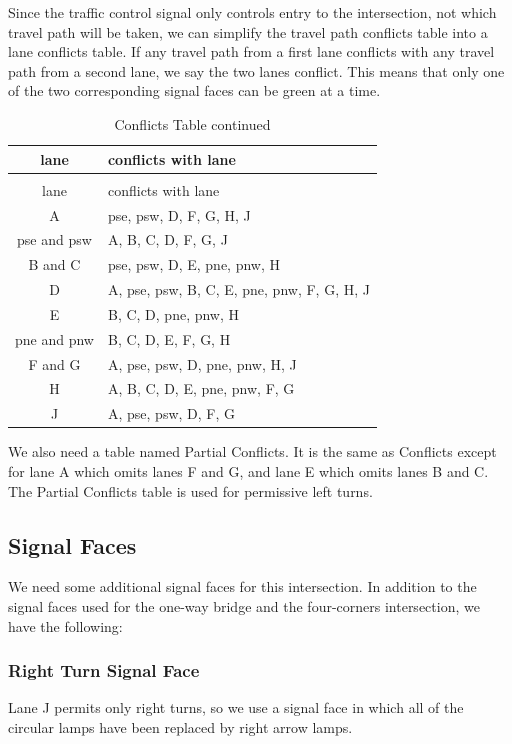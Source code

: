 \documentclass[letterpaper,twoside]{article}
\begin{document}
Since the traffic control signal only controls entry to the
intersection, not which travel path will be taken,
we can simplify the travel path conflicts table into a lane
conflicts table.  If any travel path from a first lane conflicts with
any travel path from a second lane, we say the two lanes conflict.
This means that only one of the two corresponding signal faces
can be green at a time.

\begin{longtable}{c | l}
  \caption{Conflicts Table} \\
  lane & conflicts with lane \\
  \hline \endfirsthead
  \caption{Conflicts Table continued} \\
  lane & conflicts with lane \\
  \hline \endhead
  A & pse, psw, D, F, G, H, J \\
  pse and psw & A, B, C, D, F, G, J \\
  B and C & pse, psw, D, E, pne, pnw, H \\
  D & A, pse, psw, B, C, E, pne, pnw, F, G, H, J \\
  E & B, C, D, pne, pnw, H \\
  pne and pnw & B, C, D, E, F, G, H \\
  F and G & A, pse, psw, D, pne, pnw, H, J \\
  H & A, B, C, D, E, pne, pnw, F, G \\
  J & A, pse, psw, D, F, G \\
\end{longtable}

We also need a table named Partial Conflicts.  It is the same
as Conflicts except for lane A which omits lanes F and G,
and lane E which omits lanes B and C.  The Partial Conflicts table
is used for permissive left turns.

\subsection{Signal Faces}

We need some additional signal faces for this intersection.  In addition
to the signal faces used for the one-way bridge and the four-corners
intersection, we have the following:

\subsubsection{Right Turn Signal Face}

Lane J permits only right turns, so we use a signal face in which all of
the circular lamps have been replaced by right arrow lamps.
\end{document}

